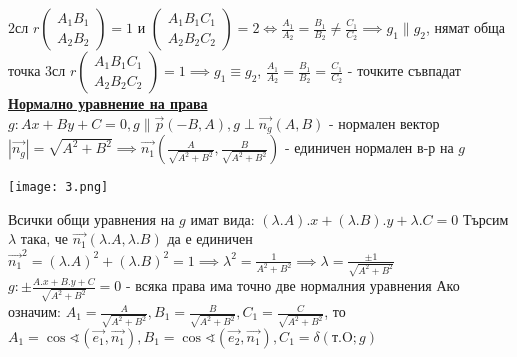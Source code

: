 \documentclass{article}
\begin{document}
$2$сл $r \begin{pmatrix} A_1 B_1 \\ A_2 B_2 \end{pmatrix} = 1$ и $\begin{pmatrix} A_1 B_1 C_1 \\ A_2 B_2 C_2 
\end{pmatrix} = 2 \iff \frac{A_1}{A_2} = \frac{B_1}{B_2} \neq \frac{C_1}{C_2} \implies g_1 \parallel g_2$, нямат обща точка \newline\newline
$3$сл $r \begin{pmatrix} A_1 B_1 C_1 \\ A_2 B_2 C_2 \end{pmatrix} = 1 \implies g_1 \equiv g_2$,
$\frac{A_1}{A_2} = \frac{B_1}{B_2} = \frac{C_1}{C_2}$ - точките съвпадат\newline\newline
\textbf{\underline{Нормално уравнение на права}} \newline\newline
$g: Ax + By + C = 0, g \parallel \vec{p}(-B, A), g \perp \vec{n_g}(A, B)$ - нормален вектор \newline
$|\vec{n_g}| = \sqrt{A^2 + B^2} \implies \vec{n_1}(\frac{A}{\sqrt{A^2 + B^2}}, \frac{B}{\sqrt{A^2 + B^2}})$ -
единичен нормален в-р на $g$ \newline\newline
\begin{center}
    \texttt{[image: 3.png]}
\end{center}
Всички общи уравнения на $g$ имат вида: $(\lambda.A).x + (\lambda.B).y + \lambda.C = 0$ \newline\newline
Търсим $\lambda$ така, че $\vec{n_1}(\lambda.A, \lambda.B)$ да е единичен \newline
$\vec{n_1}^2 = (\lambda.A)^2 + (\lambda.B)^2 = 1 \implies \lambda^2 = \frac{1}{A^2 + B^2} \implies \lambda =
\frac{\pm1}{\sqrt{A^2 + B^2}}$ \newline\newline
$g: \pm \frac{A.x + B.y + C}{\sqrt{A^2 + B^2}} = 0$ - всяка права има точно две нормалния уравнения \newline
Ако означим: $A_1 = \frac{A}{\sqrt{A^2 + B^2}}, B_1 = \frac{B}{\sqrt{A^2 + B^2}}, C_1 = \frac{C}{\sqrt{A^2 + B^2}}$,
то $A_1 = \cos\sphericalangle(\vec{e_1}, \vec{n_1}), B_1 = \cos\sphericalangle(\vec{e_2}, \vec{n_1}), C_1 =
\delta(\text{т.O}; g)$ \newline\newline
\end{document}
